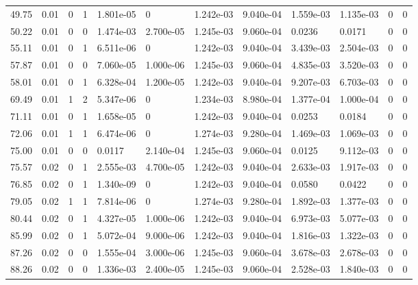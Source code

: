 \documentclass[preview]{standalone}
\begin{document}
{{\begin{tabular}{L{1.2cm}C{1.2cm} C{0.3cm}C{0.5cm} C{1.4cm}C{1.4cm} C{1.4cm}C{1.4cm} C{1.6cm}C{1.6cm} C{1.6cm}C{1.6cm}}
  49.75  &  0.01  & 0     &  1 &  1.801e-05  & 0  &  1.242e-03&   9.040e-04& 1.559e-03 & 1.135e-03   &  0 & 0  \\ 
  50.22  &  0.01  & 0     &  0 &  1.474e-03  & 2.700e-05  &  1.245e-03&   9.060e-04& 0.0236 & 0.0171   &  0 & 0  \\ 
  55.11  &  0.01  & 0     &  1 &  6.511e-06  & 0  &  1.242e-03&   9.040e-04& 3.439e-03 & 2.504e-03   &  0 & 0  \\ 
  57.87  &  0.01  & 0     &  0 &  7.060e-05  & 1.000e-06  &  1.245e-03&   9.060e-04& 4.835e-03 & 3.520e-03   &  0 & 0  \\ 
  58.01  &  0.01  & 0     &  1 &  6.328e-04  & 1.200e-05  &  1.242e-03&   9.040e-04& 9.207e-03 & 6.703e-03   &  0 & 0  \\ 
  69.49  &  0.01  & 1     &  2 &  5.347e-06  & 0  &  1.234e-03&   8.980e-04& 1.377e-04 & 1.000e-04   &  0 & 0  \\ 
  71.11  &  0.01  & 0     &  1 &  1.658e-05  & 0  &  1.242e-03&   9.040e-04& 0.0253 & 0.0184   &  0 & 0  \\ 
  72.06  &  0.01  & 1     &  1 &  6.474e-06  & 0  &  1.274e-03&   9.280e-04& 1.469e-03 & 1.069e-03   &  0 & 0  \\ 
  75.00  &  0.01  & 0     &  0 &  0.0117  & 2.140e-04  &  1.245e-03&   9.060e-04& 0.0125 & 9.112e-03   &  0 & 0  \\ 
  75.57  &  0.02  & 0     &  1 &  2.555e-03  & 4.700e-05  &  1.242e-03&   9.040e-04& 2.633e-03 & 1.917e-03   &  0 & 0  \\ 
  76.85  &  0.02  & 0     &  1 &  1.340e-09  & 0  &  1.242e-03&   9.040e-04& 0.0580 & 0.0422   &  0 & 0  \\ 
  79.05  &  0.02  & 1     &  1 &  7.814e-06  & 0  &  1.274e-03&   9.280e-04& 1.892e-03 & 1.377e-03   &  0 & 0  \\ 
  80.44  &  0.02  & 0     &  1 &  4.327e-05  & 1.000e-06  &  1.242e-03&   9.040e-04& 6.973e-03 & 5.077e-03   &  0 & 0  \\ 
  85.99  &  0.02  & 0     &  1 &  5.072e-04  & 9.000e-06  &  1.242e-03&   9.040e-04& 1.816e-03 & 1.322e-03   &  0 & 0  \\ 
  87.26  &  0.02  & 0     &  0 &  1.555e-04  & 3.000e-06  &  1.245e-03&   9.060e-04& 3.678e-03 & 2.678e-03   &  0 & 0  \\ 
  88.26  &  0.02  & 0     &  0 &  1.336e-03  & 2.400e-05  &  1.245e-03&   9.060e-04& 2.528e-03 & 1.840e-03   &  0 & 0  \\ 
\hline 
\end{tabular} 

}}
\end{document}
